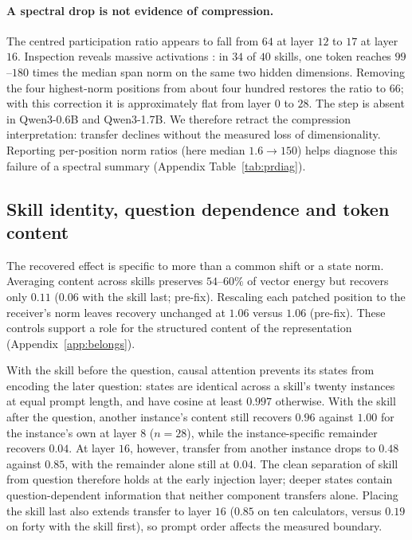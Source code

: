 \documentclass{article}
\begin{document}
\paragraph{A spectral drop is not evidence of compression.}
The centred participation ratio appears to fall from $64$ at layer $12$ to
$17$ at layer $16$. Inspection reveals massive activations
\citep{sun2024massive, shi2026melayer}: in $34$ of $40$ skills, one token reaches
$99$--$180$ times the median span norm on the same two hidden dimensions.
Removing the four highest-norm positions from about four hundred restores the
ratio to $66$; with this correction it is approximately flat from layer $0$ to
$28$. The step is absent in Qwen3-0.6B and Qwen3-1.7B. We therefore retract the
compression interpretation: transfer declines without the measured loss of
dimensionality. Reporting per-position norm ratios (here median $1.6\to150$)
helps diagnose this failure of a spectral summary (Appendix
Table~\ref{tab:prdiag}).

\subsection{Skill identity, question dependence and token content}
\label{sec:whose}

The recovered effect is specific to more than a common shift or a state norm.
Averaging content across skills preserves $54$--$60\%$ of vector energy but
recovers only $0.11$ ($0.06$ with the skill last; pre-fix). Rescaling each patched
position to the receiver's norm leaves recovery unchanged at $1.06$ versus
$1.06$ (pre-fix). These controls support a role for the structured content of
the representation (Appendix~\ref{app:belongs}).

With the skill before the question, causal attention prevents its states from
encoding the later question: states are identical across a skill's twenty
instances at equal prompt length, and have cosine at least $0.997$ otherwise.
With the skill after the question, another instance's content still recovers
$0.96$ against $1.00$ for the instance's own at layer $8$ ($n=28$), while the
instance-specific remainder recovers $0.04$. At layer $16$, however, transfer
from another instance drops to $0.48$ against $0.85$, with the remainder alone
still at $0.04$. The clean separation of skill from question therefore holds at
the early injection layer; deeper states contain question-dependent information
that neither component transfers alone. Placing the skill last also extends
transfer to layer $16$ ($0.85$ on ten calculators, versus $0.19$ on forty with
the skill first), so prompt order affects the measured boundary.
\end{document}

